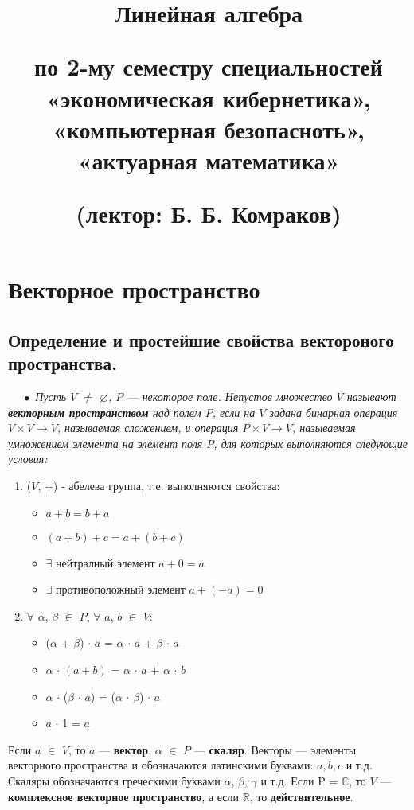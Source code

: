 \documentclass[a4paper, 12pt]{report}
\title{\textbf{\Huge{Линейная алгебра}}\par\bigskipКонспект по 2-му семестру
	специальностей «экономическая кибернетика», «компьютерная безопасноть», «актуарная математика»\par(лектор: Б. Б. Комраков)}
\date{}
\begin{document}
	\maketitle
	\tableofcontents{}
	\chapter{Векторное пространство}
	\section{Определение и простейшие свойства вектороного пространства.}
	$\quad\; \bullet$ \textit{Пусть $V$ $\ne$ $\varnothing$, $P$ --- некоторое поле. Непустое множество $V$ называют \textbf{векторным пространством} над полем $P$, если на $V$ задана бинарная операция $V\times V \to V$, называемая сложением, и операция $P\times V \to V$, называемая умножением элемента на элемент поля $P$, для которых выполняются следующие условия:}
	\begin{enumerate} 
		\item ($V$, +) - абелева группа, т.е. выполняются свойства:
		\begin{itemize} 
			\item $a + b = b + a$
			\item $(a + b) + c = a + (b + c)$
			\item $\exists$ нейтралный элемент $a + 0 = a$
			\item $\exists$ противоположный элемент $a + (-a) = 0$
		\end{itemize}
		\item $\forall$ $\alpha$, $\beta$ $\in$ $P$, $\forall$ $a$, $b$ $\in$ $V$:
		\begin{itemize} 
			\item ($\alpha$ + $\beta$) $\cdot$ $a$ = $\alpha$ $\cdot$ $a$ + $\beta$ $\cdot$ $a$
			\item $\alpha$ $\cdot$ $(a + b)$ = $\alpha$ $\cdot$ $a$ + $\alpha$ $\cdot$ $b$
			\item $\alpha$ $\cdot$ ($\beta$ $\cdot$ $a$) = ($\alpha$ $\cdot$ $\beta$)  $\cdot$ $a$
			\item $a$ $\cdot$ 1 = $a$
		\end{itemize}
	\end{enumerate}
	\par\bigskip
	Если $a$ $\in$ $V$, то $a$ --- \textbf{вектор}, $\alpha$ $\in$ $P$ --- \textbf{скаляр}. Векторы --- элементы векторного пространства и обозначаются латинскими буквами: $a, b, c$ и т.д. Скаляры обозначаются греческими буквами $\alpha$, $\beta$, $\gamma$ и т.д. Если P = $\mathbb{C}$, то $V$ --- \textbf{комплексное векторное пространство}, а если $\mathbb{R}$, то \textbf{действительное}.
\end{document}
